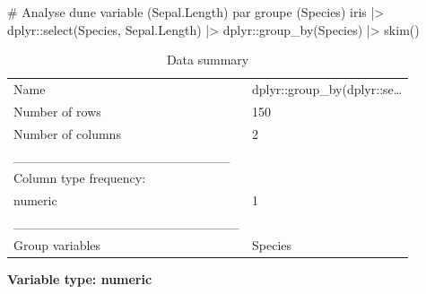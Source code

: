 \documentclass[
  letterpaper,
]{book}
\newenvironment{Shaded}{\begin{snugshade}}{\end{snugshade}}
\newcommand{\CommentTok}[1]{\textcolor[rgb]{0.37,0.37,0.37}{#1}}
\newcommand{\FunctionTok}[1]{\textcolor[rgb]{0.28,0.35,0.67}{#1}}
\newcommand{\NormalTok}[1]{\textcolor[rgb]{0.00,0.23,0.31}{#1}}
\newcommand{\SpecialCharTok}[1]{\textcolor[rgb]{0.37,0.37,0.37}{#1}}
\begin{document}
\begin{Shaded}
\begin{Highlighting}[]
\CommentTok{\# Analyse d\textquotesingle{}une variable (Sepal.Length) par groupe (Species)}
\NormalTok{iris }\SpecialCharTok{|\textgreater{}}
\NormalTok{  dplyr}\SpecialCharTok{::}\FunctionTok{select}\NormalTok{(Species, Sepal.Length) }\SpecialCharTok{|\textgreater{}} 
\NormalTok{  dplyr}\SpecialCharTok{::}\FunctionTok{group\_by}\NormalTok{(Species) }\SpecialCharTok{|\textgreater{}}
  \FunctionTok{skim}\NormalTok{()}
\end{Highlighting}
\end{Shaded}

\begin{longtable}[]{@{}ll@{}}
\caption{Data summary}\tabularnewline
\toprule\noalign{}
\endfirsthead
\endhead
\bottomrule\noalign{}
\endlastfoot
Name & dplyr::group\_by(dplyr::se\ldots{} \\
Number of rows & 150 \\
Number of columns & 2 \\
\_\_\_\_\_\_\_\_\_\_\_\_\_\_\_\_\_\_\_\_\_\_\_ & \\
Column type frequency: & \\
numeric & 1 \\
\_\_\_\_\_\_\_\_\_\_\_\_\_\_\_\_\_\_\_\_\_\_\_\_ & \\
Group variables & Species \\
\end{longtable}

\textbf{Variable type: numeric}
\end{document}
